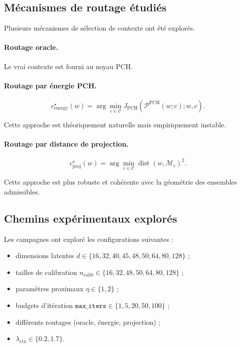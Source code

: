 \documentclass[11pt,a4paper]{article}
\newcommand{\1}{\mathbf 1}
\begin{document}
\subsection{Mécanismes de routage étudiés}

Plusieurs mécanismes de sélection de contexte ont été explorés.

\paragraph{Routage oracle.}
Le vrai contexte est fourni au noyau PCH.

\paragraph{Routage par énergie PCH.}
\[
c^\star_{\mathrm{energy}}(w)
=
\arg\min_{c\in\mathcal C}
J_{\mathrm{PCH}}(\mathcal P^{\mathrm{PCH}}(w;c);w,c).
\]

Cette approche est théoriquement naturelle mais empiriquement instable.

\paragraph{Routage par distance de projection.}
\[
c^\star_{\mathrm{proj}}(w)
=
\arg\min_{c\in\mathcal C}\operatorname{dist}(w,\mathcal M_c)^2.
\]

Cette approche est plus robuste et cohérente avec la géométrie des ensembles admissibles.

\subsection{Chemins expérimentaux explorés}

Les campagnes ont exploré les configurations suivantes :
\begin{itemize}[leftmargin=2em]
    \item dimensions latentes \(d \in \{16,32,40,45,48,50,64,80,128\}\) ;
    \item tailles de calibration \(n_{\mathrm{calib}} \in \{16,32,48,50,64,80,128\}\) ;
    \item paramètres proximaux \(\eta \in \{1,2\}\) ;
    \item budgets d’itération \(\texttt{max\_iters} \in \{1,5,20,50,100\}\) ;
    \item différents routages (oracle, énergie, projection) ;
    \item \(\lambda_{\mathrm{ctx}} \in \{0.2, 1.7\}\).
\end{itemize}
\end{document}

